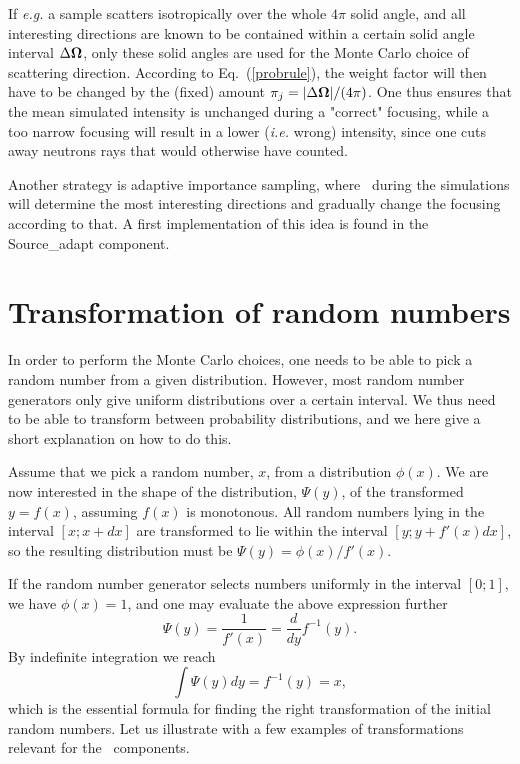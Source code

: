 If {\em e.g.} a sample scatters isotropically
over the whole $4\pi$ solid angle, and all interesting
directions are known to be contained within a certain
solid angle interval $\Delta \mbox{\boldmath $\Omega$}$, only these solid angles
are used for the Monte Carlo choice of scattering direction.
According to Eq.~(\ref{probrule}), the weight factor will then have
to be changed by the (fixed) amount
$\pi_j = |\Delta \mbox{\boldmath $\Omega$}| / (4 \pi)$.
One thus ensures that the mean simulated intensity is unchanged
during a "correct" focusing, while a too narrow focusing will
result in a lower (\textit{i.e.} wrong) intensity, since one cuts
away neutrons rays that would otherwise have counted.

Another strategy is adaptive importance sampling, %
where \MCS\ during the simulations will determine
the most interesting directions and gradually change
the focusing according to that. A first implementation of this idea is
found in the Source\_adapt component.%

\section{Transformation of random numbers}
In order to perform the Monte Carlo choices, one needs to be able to
pick a random number from a given distribution. However, most
random number generators only give
uniform distributions over a certain interval.
We thus need to be able to transform between probability distributions,
and we here give a short explanation on how to do this.

Assume that we pick a random number, $x$, from a distribution $\phi(x)$.
We are now interested in the shape of the distribution, $\Psi(y)$, of the
transformed $y=f(x)$, assuming $f(x)$ is monotonous.
All random numbers lying in the interval $[x; x+dx]$
are transformed to lie within the interval $[y; y+f'(x)dx]$, so the
resulting distribution must be $\Psi(y) = \phi(x) / f'(x)$.

If the random number generator selects numbers uniformly in the interval
$[0; 1]$, we have $\phi(x) = 1$, and
one may evaluate the above expression further
\begin{equation}
\Psi(y) = \frac{1}{f'(x)} = \frac{d}{dy} f^{-1}(y) .
\end{equation}
By indefinite integration we reach
\begin{equation}
\label{e:randtrans}
\int \Psi(y) dy = f^{-1}(y) = x ,
\end{equation}
which is the essential formula for finding the right transformation
of the initial random numbers.
Let us illustrate with a few examples of transformations relevant for the
\MCS\ components.

